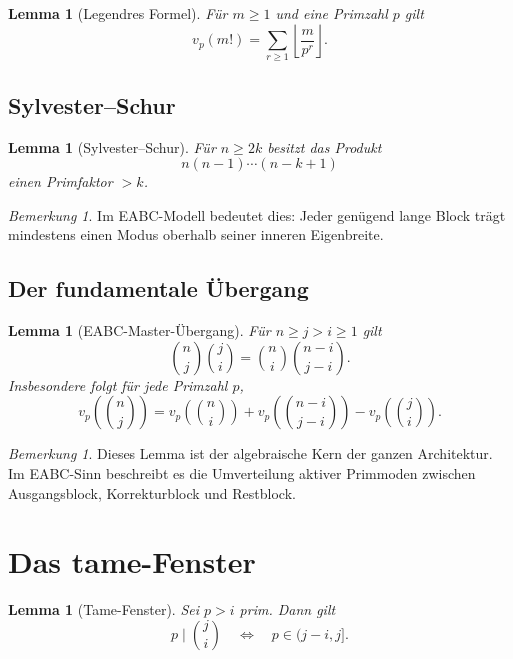 \documentclass[12pt,a4paper]{article}
\theoremstyle{plain}
\newtheorem{lemma}[theorem]{Lemma}
\theoremstyle{definition}
\theoremstyle{remark}
\newtheorem{remark}[theorem]{Bemerkung}
\begin{document}
	\begin{lemma}[Legendres Formel]
		Für \(m\ge1\) und eine Primzahl \(p\) gilt
		\[
		v_p(m!)=\sum_{r\ge1}\left\lfloor \frac{m}{p^r}\right\rfloor.
		\]
	\end{lemma}
	
	\subsection{Sylvester--Schur}
	
	\begin{lemma}[Sylvester--Schur]
		Für \(n\ge 2k\) besitzt das Produkt
		\[
		n(n-1)\cdots(n-k+1)
		\]
		einen Primfaktor \(>k\).
	\end{lemma}
	
	\begin{remark}
		Im EABC-Modell bedeutet dies: Jeder genügend lange Block trägt mindestens einen Modus oberhalb seiner inneren Eigenbreite.
	\end{remark}
	
	\subsection{Der fundamentale Übergang}
	
	\begin{lemma}[EABC-Master-Übergang]
		\label{lem:master}
		Für \(n\ge j>i\ge1\) gilt
		\[
		\binom{n}{j}\binom{j}{i}
		=
		\binom{n}{i}\binom{n-i}{j-i}.
		\]
		Insbesondere folgt für jede Primzahl \(p\),
		\[
		v_p\!\left(\binom{n}{j}\right)
		=
		v_p\!\left(\binom{n}{i}\right)
		+
		v_p\!\left(\binom{n-i}{j-i}\right)
		-
		v_p\!\left(\binom{j}{i}\right).
		\]
	\end{lemma}
	
	\begin{remark}
		Dieses Lemma ist der algebraische Kern der ganzen Architektur. Im EABC-Sinn beschreibt es die Umverteilung aktiver Primmoden zwischen Ausgangsblock, Korrekturblock und Restblock.
	\end{remark}
	
	\section{Das tame-Fenster}
	
	\begin{lemma}[Tame-Fenster]
		\label{lem:tame-fenster}
		Sei \(p>i\) prim. Dann gilt
		\[
		p\mid \binom{j}{i}
		\quad\Longleftrightarrow\quad
		p\in (j-i,j].
		\]
	\end{lemma}
	
\end{document}
